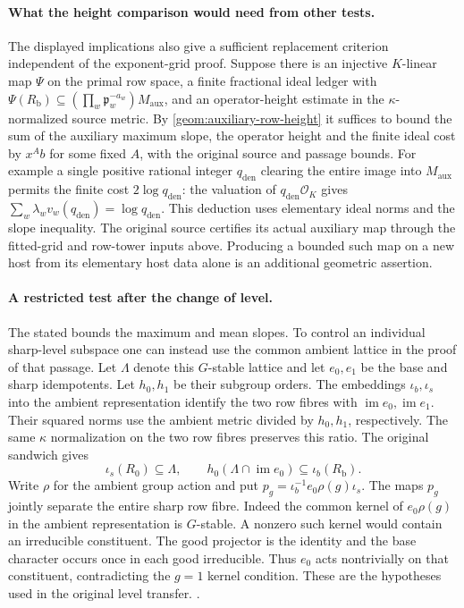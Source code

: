 \paragraph{What the height comparison would need from other tests.}
The displayed implications also give a sufficient replacement
criterion independent of the exponent-grid proof. Suppose there is
an injective \(K\)-linear map \(\Psi\) on the primal row space, a
finite fractional ideal ledger with
\(\Psi(R_{\mathrm b})\subseteq (\prod_w\mathfrak p_w^{-a_w})
 M_{\mathrm{aux}}\), and an operator-height estimate in the
\(\kappa\)-normalized source metric. By
\eqref{geom:auxiliary-row-height} it suffices to bound the sum of the
auxiliary maximum slope, the operator height and the finite ideal
cost by \(x^A b\) for some fixed \(A\), with the original source and
passage bounds. For example a single positive rational integer
\(q_{\mathrm{den}}\) clearing the entire image into
\(M_{\mathrm{aux}}\) permits the finite cost \(2\log q_{\mathrm{den}}\):
the valuation of \(q_{\mathrm{den}}\mathcal O_K\) gives
\(\sum_w\lambda_wv_w(q_{\mathrm{den}})=\log q_{\mathrm{den}}\).
This deduction uses elementary ideal norms and the slope
inequality. The original source certifies its actual auxiliary
map through the fitted-grid and row-tower inputs above.
Producing a bounded such map on a new host from its elementary
host data alone is an additional geometric assertion.

\paragraph{A restricted test after the change of level.}
The stated  bounds the maximum and mean slopes. To
control an individual sharp-level subspace one can instead use
the common ambient lattice in the proof of that passage. Let
\(\Lambda\) denote this \(G\)-stable lattice and let \(e_0,e_1\)
be the base and sharp idempotents. Let \(h_0,h_1\) be their
subgroup orders. The embeddings
\(\iota_b,\iota_s\) into the ambient representation identify
the two row fibres with \(\operatorname{im}e_0,\operatorname{im}e_1\).
Their squared norms use the ambient metric divided by \(h_0,h_1\),
respectively. The same \(\kappa\) normalization on the two row
fibres preserves this ratio. The original sandwich gives
\[
 \iota_s(R_0)\subseteq\Lambda,\qquad
 h_0(\Lambda\cap\operatorname{im}e_0)\subseteq\iota_b(R_{\mathrm b}).
\]
Write \(\rho\) for the ambient group action and put
\(p_g=\iota_b^{-1}e_0\rho(g)\iota_s\). The maps \(p_g\) jointly
separate the entire sharp row fibre. Indeed the common kernel of
\(e_0\rho(g)\) in the ambient representation is \(G\)-stable. A
nonzero such kernel would contain an irreducible constituent.
The good projector is the identity and the base character
occurs once in each good irreducible. Thus \(e_0\) acts nontrivially
on that constituent, contradicting the \(g=1\) kernel condition.
These are the hypotheses used in the original level transfer.
.

